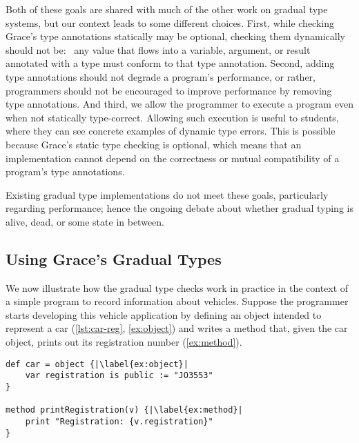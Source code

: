 Both of these goals are shared with
much of the other work on gradual type systems,
but our context leads to some different choices.
First,
while checking Grace's type annotations statically may be optional,
checking them dynamically should not be:%
~any value that flows into a variable, argument, or result
annotated with a type must conform to that type annotation.
Second, 
adding type annotations should not degrade a program's performance,
or rather, programmers should not be encouraged to
improve performance by removing type annotations.
And third, 
we allow the programmer to execute a program even when not statically type-correct.
Allowing such execution is useful to students,
where they can see concrete examples of dynamic type errors.
This is possible because Grace's static type checking is optional,
which means that an
implementation cannot depend on the correctness or mutual
compatibility of a program's type
annotations.


Existing gradual type
implementations do not meet these goals, particularly regarding
performance; hence the ongoing debate about whether gradual typing is
alive, dead, or some state
in between\citep{Takikawa2016,Vitousek2017,Muehlboeck2017,Bauman2017,Richards2017,Greenman2018,Greenman2019jfp}.


\subsection{Using Grace's Gradual Types}

We now illustrate how the gradual type checks work in practice
in the context of a simple program to record information about vehicles.
Suppose the programmer starts developing this vehicle
application by defining an object intended to represent a car
(\cref{lst:car-reg}, \cref{ex:object}) and writes a method that, given
the car object, prints out its registration number (\cref{ex:method}).
%

\begin{lstlisting}[caption={The start of a simple Grace program for tracking vehicle information.},%
  float=h,label=lst:car-reg,escapechar=|,columns=flexible]
def car = object {|\label{ex:object}|
    var registration is public := "JO3553"
}

method printRegistration(v) {|\label{ex:method}|
    print "Registration: {v.registration}"
}
\end{lstlisting}



